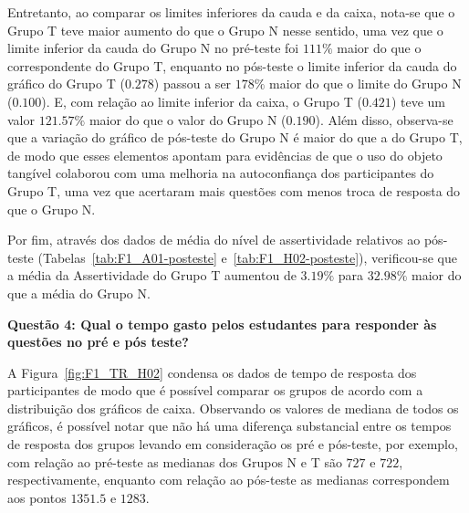 Entretanto, ao comparar os limites inferiores da cauda e da caixa, nota-se que o Grupo T teve maior aumento do que o Grupo N nesse sentido, uma vez que o limite inferior da cauda do Grupo N no pré-teste foi $111\%$ maior do que o correspondente do Grupo T, enquanto no pós-teste o limite inferior da cauda do gráfico do Grupo T ($0.278$) passou a ser $178\%$ maior do que o limite do Grupo N ($0.100$). E, com relação ao limite inferior da caixa, o Grupo T ($0.421$) teve um valor $121.57\%$ maior do que o valor do Grupo N ($0.190$). Além disso, observa-se que a variação do gráfico de pós-teste do Grupo N é maior do que a do Grupo T, de modo que esses elementos apontam para evidências de que o uso do objeto tangível colaborou com uma melhoria na autoconfiança dos participantes do Grupo T, uma vez que acertaram mais questões com menos troca de resposta do que o Grupo N.

Por fim, através dos dados de média do nível de assertividade relativos ao pós-teste (Tabelas~\ref{tab:F1_A01-posteste} e~\ref{tab:F1_H02-posteste}), verificou-se que a média da Assertividade do Grupo T aumentou de $3.19\%$ para $32.98\%$ maior do que a média do Grupo N.


\textbf{Questão 4: Qual o tempo gasto pelos estudantes para responder às questões no pré e pós teste?}

A Figura~\ref{fig:F1_TR_H02} condensa os dados de tempo de resposta dos participantes de modo que é possível comparar os grupos de acordo com a distribuição dos gráficos de caixa. Observando os valores de mediana de todos os gráficos, é possível notar que não há uma diferença substancial entre os tempos de resposta dos grupos levando em consideração os pré e pós-teste, por exemplo, com relação ao pré-teste as medianas dos Grupos N e T são $727$ e $722$, respectivamente, enquanto com relação ao pós-teste as medianas correspondem aos pontos $1351.5$ e $1283$.

